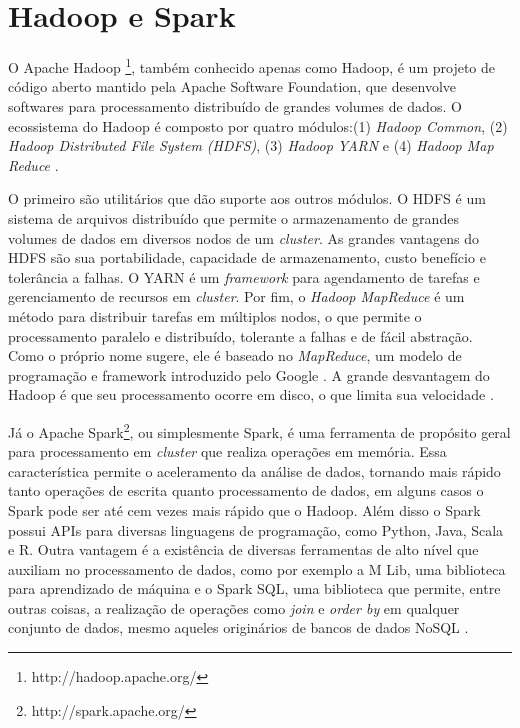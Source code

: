 \section{Hadoop e Spark}
\label{sec:spark}

O Apache Hadoop \footnote{http://hadoop.apache.org/}, também conhecido apenas como Hadoop, 
é um projeto de código aberto mantido pela Apache Software Foundation, que desenvolve 
softwares para processamento distribuído de grandes volumes de dados. O ecossistema do 
Hadoop é composto por quatro módulos:(1) \textit{Hadoop Common}, (2) 
\textit{Hadoop Distributed File System (HDFS)}, (3) \textit{Hadoop YARN} e (4) 
\textit{Hadoop Map Reduce} \cite{kumar2014apache}. 

O primeiro são utilitários que dão suporte aos outros módulos. O HDFS é um sistema de 
arquivos distribuído que permite o armazenamento de grandes volumes de dados em 
diversos nodos de um \textit{cluster}. As grandes vantagens do HDFS são sua portabilidade, 
capacidade de armazenamento, custo benefício e tolerância a falhas. O YARN é um 
\textit{framework} para agendamento de tarefas e gerenciamento de recursos em 
\textit{cluster}. Por fim, o \textit{Hadoop MapReduce} é um método para distribuir tarefas 
em múltiplos nodos, o que permite o processamento paralelo e distribuído, tolerante a 
falhas e de fácil abstração. Como o próprio nome sugere, ele é baseado no \textit{MapReduce}, 
um modelo de programação e framework introduzido pelo Google \cite{kumar2014apache}. A grande 
desvantagem do Hadoop é que seu  processamento ocorre em disco, o que limita sua 
velocidade \cite{shoro2015big}.

Já o Apache Spark\footnote{http://spark.apache.org/}, ou simplesmente Spark, é uma ferramenta 
de propósito geral para processamento em \textit{cluster} que realiza operações em memória. 
Essa característica permite o aceleramento da análise de dados, tornando mais rápido 
tanto operações de escrita quanto processamento de dados, em alguns casos o Spark pode ser 
até cem vezes mais rápido que o Hadoop. Além disso o Spark possui APIs para diversas 
linguagens de programação, como Python, Java, Scala e R. Outra vantagem é a existência de 
diversas ferramentas de alto nível que auxiliam no processamento de dados, como por exemplo 
a M Lib, uma biblioteca para aprendizado de máquina e o Spark SQL, uma biblioteca que 
permite, entre outras coisas, a realização de operações como \textit{join} e 
\textit{order by} em qualquer conjunto de dados, mesmo aqueles originários de bancos de 
dados NoSQL \cite{shoro2015big}.

